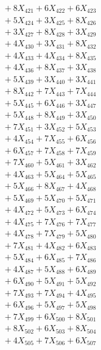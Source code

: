 \documentclass[a4paper,10pt]{article}
\begin{document}
{\begin{align}
&\;  + 8 X_{421} + 6 X_{422} + 6 X_{423} \\[0.3ex]
&\;  + 5 X_{424} + 3 X_{425} + 8 X_{426} \\[0.3ex]
&\;  + 3 X_{427} + 8 X_{428} + 3 X_{429} \\[0.5ex]\allowbreak
&\;  + 4 X_{430} + 3 X_{431} + 8 X_{432} \\[0.3ex]
&\;  + 4 X_{433} + 4 X_{434} + 8 X_{435} \\[0.3ex]
&\;  + 4 X_{436} + 8 X_{437} + 3 X_{438} \\[0.3ex]
&\;  + 5 X_{439} + 3 X_{440} + 3 X_{441} \\[0.3ex]
&\;  + 8 X_{442} + 7 X_{443} + 7 X_{444} \\[0.3ex]
&\;  + 5 X_{445} + 6 X_{446} + 3 X_{447} \\[0.3ex]
&\;  + 5 X_{448} + 8 X_{449} + 3 X_{450} \\[0.3ex]
&\;  + 7 X_{451} + 3 X_{452} + 5 X_{453} \\[0.3ex]
&\;  + 4 X_{454} + 7 X_{455} + 6 X_{456} \\[0.3ex]
&\;  + 6 X_{457} + 7 X_{458} + 7 X_{459} \\[0.5ex]\allowbreak
&\;  + 7 X_{460} + 5 X_{461} + 3 X_{462} \\[0.3ex]
&\;  + 4 X_{463} + 5 X_{464} + 5 X_{465} \\[0.3ex]
&\;  + 5 X_{466} + 8 X_{467} + 4 X_{468} \\[0.3ex]
&\;  + 5 X_{469} + 5 X_{470} + 5 X_{471} \\[0.3ex]
&\;  + 4 X_{472} + 5 X_{473} + 6 X_{474} \\[0.3ex]
&\;  + 4 X_{475} + 7 X_{476} + 7 X_{477} \\[0.3ex]
&\;  + 4 X_{478} + 7 X_{479} + 5 X_{480} \\[0.3ex]
&\;  + 7 X_{481} + 4 X_{482} + 6 X_{483} \\[0.3ex]
&\;  + 5 X_{484} + 6 X_{485} + 7 X_{486} \\[0.3ex]
&\;  + 4 X_{487} + 5 X_{488} + 6 X_{489} \\[0.5ex]\allowbreak
&\;  + 6 X_{490} + 5 X_{491} + 5 X_{492} \\[0.3ex]
&\;  + 7 X_{493} + 7 X_{494} + 4 X_{495} \\[0.3ex]
&\;  + 6 X_{496} + 5 X_{497} + 5 X_{498} \\[0.3ex]
&\;  + 7 X_{499} + 6 X_{500} + 8 X_{501} \\[0.3ex]
&\;  + 8 X_{502} + 6 X_{503} + 8 X_{504} \\[0.3ex]
&\;  + 4 X_{505} + 7 X_{506} + 6 X_{507} \\[0.3ex]

\end{align}}
\end{document}
